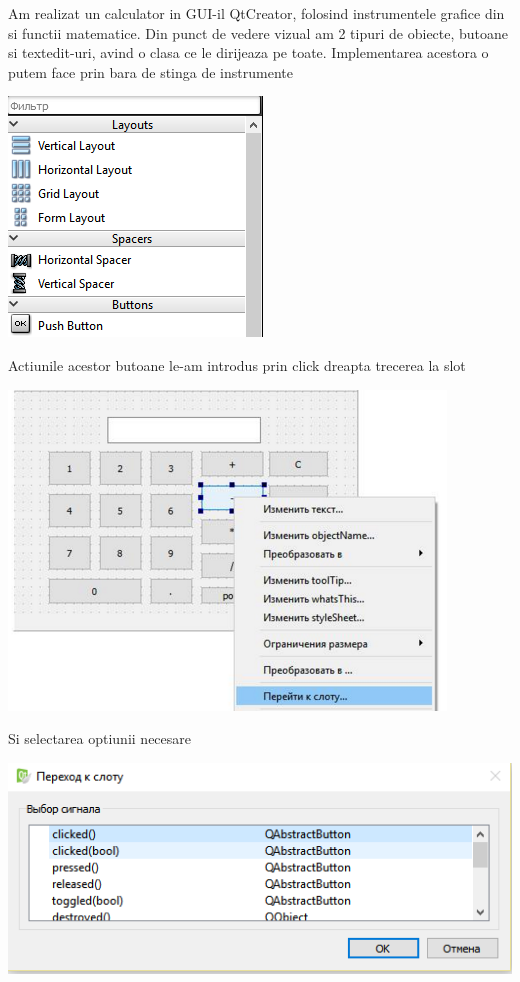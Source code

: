Am realizat un calculator in GUI-il QtCreator, folosind instrumentele grafice din si functii matematice. Din punct de vedere vizual am 2 tipuri de obiecte, butoane si textedit-uri, avind o clasa ce le dirijeaza pe toate. Implementarea acestora o putem face prin bara de stinga de instrumente
\begin{center}
\includegraphics[width=0.6\linewidth]{1stinga}
\end{center}
Actiunile acestor butoane le-am introdus prin click dreapta trecerea la slot
\begin{center}
\includegraphics[width=0.7\linewidth]{11}
\end{center}
Si selectarea optiunii necesare
\begin{center}
\includegraphics[width=0.7\linewidth]{12}
\end{center}


